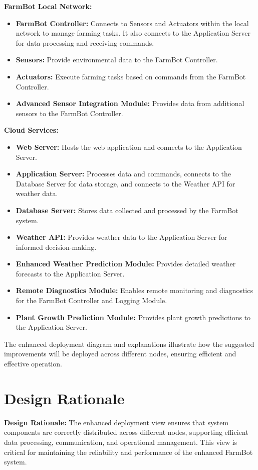 \textbf{FarmBot Local Network:}
\begin{itemize}
    \item \textbf{FarmBot Controller:} Connects to Sensors and Actuators within the local network to manage farming tasks. It also connects to the Application Server for data processing and receiving commands.
    \item \textbf{Sensors:} Provide environmental data to the FarmBot Controller.
    \item \textbf{Actuators:} Execute farming tasks based on commands from the FarmBot Controller.
    \item \textbf{Advanced Sensor Integration Module:} Provides data from additional sensors to the FarmBot Controller.
\end{itemize}

\textbf{Cloud Services:}
\begin{itemize}
    \item \textbf{Web Server:} Hosts the web application and connects to the Application Server.
    \item \textbf{Application Server:} Processes data and commands, connects to the Database Server for data storage, and connects to the Weather API for weather data.
    \item \textbf{Database Server:} Stores data collected and processed by the FarmBot system.
    \item \textbf{Weather API:} Provides weather data to the Application Server for informed decision-making.
    \item \textbf{Enhanced Weather Prediction Module:} Provides detailed weather forecasts to the Application Server.
    \item \textbf{Remote Diagnostics Module:} Enables remote monitoring and diagnostics for the FarmBot Controller and Logging Module.
    \item \textbf{Plant Growth Prediction Module:} Provides plant growth predictions to the Application Server.
\end{itemize}

The enhanced deployment diagram and explanations illustrate how the suggested improvements will be deployed across different nodes, ensuring efficient and effective operation.

\section{Design Rationale}

\textbf{Design Rationale:} The enhanced deployment view ensures that system components are correctly distributed across different nodes, supporting efficient data processing, communication, and operational management. This view is critical for maintaining the reliability and performance of the enhanced FarmBot system.


